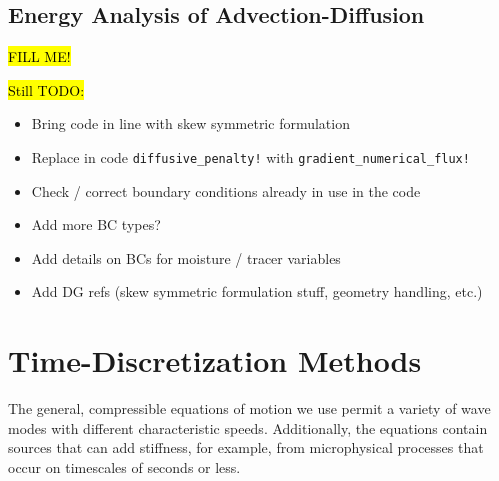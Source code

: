 \documentclass{report}
\begin{document}
\subsection{Energy Analysis of Advection-Diffusion}
\hl{FILL ME\@!}

\hl{Still TODO\@:}
\begin{itemize}
  \item Bring code in line with skew symmetric formulation
  \item Replace in code \texttt{diffusive\_penalty!} with
    \texttt{gradient\_numerical\_flux!}
  \item Check / correct boundary conditions already in use in the code
  \item Add more BC types?
  \item Add details on BCs for moisture / tracer variables
  \item Add DG refs (skew symmetric formulation stuff, geometry handling, etc.)
\end{itemize}

\section{Time-Discretization Methods}\label{s:timestepping}

The general, compressible equations of motion we use permit a variety of wave modes with different characteristic speeds. Additionally, the equations contain sources that can add stiffness, for example, from microphysical processes that occur on timescales of seconds or less.
\end{document}

